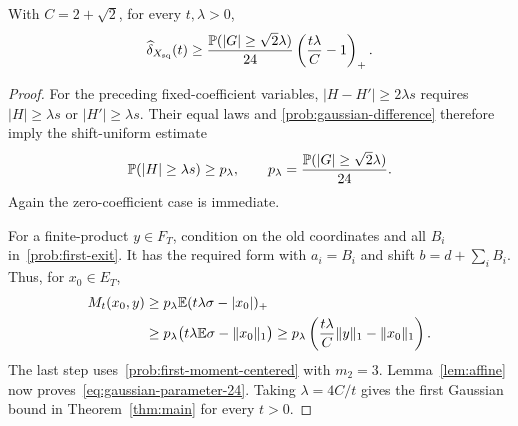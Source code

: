 \begin{proposition}\label{prob:gaussian-24}
With $C=2+\sqrt2$, for every $t,\lambda>0$,
\begin{equation}\label{eq:gaussian-parameter-24}
 \widehat\delta_{X_{\mathrm{sq}}}(t)
 \ge\frac{\mathbb P(|G|\ge\sqrt2\lambda)}{24}
       \left(\frac{t\lambda}C-1\right)_+.
\end{equation}
\end{proposition}
\begin{proof}
For the preceding fixed-coefficient variables, $|H-H'|\ge2\lambda s$
requires $|H|\ge\lambda s$ or $|H'|\ge\lambda s$.  Their equal laws and
\eqref{prob:gaussian-difference} therefore imply the shift-uniform estimate
\begin{equation}\label{prob:gaussian-shifted}
 \mathbb P(|H|\ge\lambda s)\ge p_\lambda,
 \qquad p_\lambda=\frac{\mathbb P(|G|\ge\sqrt2\lambda)}{24}.
\end{equation}
Again the zero-coefficient case is immediate.

For a finite-product $y\in F_T$, condition on the old coordinates and all
$B_i$ in~\eqref{prob:first-exit}.  It has the required form with
$a_i=B_i$ and shift $b=d+\sum_iB_i$.  Thus, for $x_0\in E_T$,
\begin{align}
 M_t(x_0,y)
 &\ge p_\lambda\mathbb E(t\lambda\sigma-|x_0|)_+\notag\\
 &\ge p_\lambda\bigl(t\lambda\mathbb E\sigma-\lVert x_0\rVert_1\bigr)
 \ge p_\lambda\left(\frac{t\lambda}{C}\lVert y\rVert_1-\lVert x_0\rVert_1\right).
 \label{prob:gaussian-24-gain}
\end{align}
The last step uses~\eqref{prob:first-moment-centered} with $m_2=3$.
Lemma~\ref{lem:affine} now proves~\eqref{eq:gaussian-parameter-24}.
Taking $\lambda=4C/t$ gives the first Gaussian bound in
Theorem~\ref{thm:main} for every $t>0$.
\end{proof}

